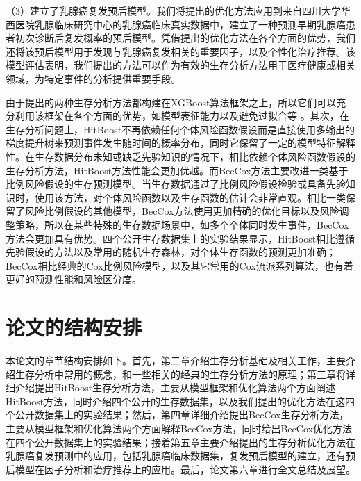 （3）建立了乳腺癌复发预后模型。我们将提出的优化方法应用到来自四川大学华西医院乳腺临床研究中心的乳腺癌临床真实数据中，建立了一种预测早期乳腺癌患者初次诊断后复发概率的预后模型。凭借提出的优化方法在各个方面的优势，我们还将该预后模型用于发现与乳腺癌复发相关的重要因子，以及个性化治疗推荐。该模型评估表明，我们提出的方法可以作为有效的生存分析方法用于医疗健康或相关领域，为特定事件的分析提供重要手段。

由于提出的两种生存分析方法都构建在XGBoost算法框架之上，所以它们可以充分利用该框架在各个方面的优势，如模型表征能力以及避免过拟合等 。其次，在生存分析问题上，HitBoost不再依赖任何个体风险函数假设而是直接使用多输出的梯度提升树来预测事件发生随时间的概率分布，同时它保留了一定的模型特征解释性。在生存数据分布未知或缺乏先验知识的情况下，相比依赖个体风险函数假设的生存分析方法，HitBoost方法性能会更加优越。而BecCox方法主要改进一类基于比例风险假设的生存预测模型。当生存数据通过了比例风险假设检验或具备先验知识时，使用该方法，对个体风险函数以及生存函数的估计会非常直观。相比一类保留了风险比例假设的其他模型，BecCox方法使用更加精确的优化目标以及风险调整策略，所以在某些特殊的生存数据场景中，如多个个体同时发生事件，BecCox方法会更加具有优势。四个公开生存数据集上的实验结果显示，HitBoost相比遵循先验假设的方法以及常用的随机生存森林，对个体生存函数的预测更加准确；BecCox相比经典的Cox比例风险模型，以及其它常用的Cox流派系列算法，也有着更好的预测性能和风险区分度。

\section{论文的结构安排}

本论文的章节结构安排如下。首先，第二章介绍生存分析基础及相关工作，主要介绍生存分析中常用的概念，和一些相关的经典的生存分析方法的原理；第三章将详细介绍提出HitBoost生存分析方法，主要从模型框架和优化算法两个方面阐述HitBoost方法，同时介绍四个公开的生存数据集，以及我们提出的优化方法在这四个公开数据集上的实验结果；然后，第四章详细介绍提出BecCox生存分析方法，主要从模型框架和优化算法两个方面解释BecCox方法，同时给出BecCox优化方法在四个公开数据集上的实验结果；接着第五章主要介绍提出的生存分析优化方法在乳腺癌复发预测中的应用，包括乳腺癌临床数据集，复发预后模型的建立，还有预后模型在因子分析和治疗推荐上的应用。最后，论文第六章进行全文总结及展望。
